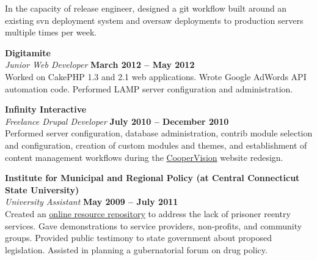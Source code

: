 \documentclass[margin,line]{resume}
\begin{document}
\begin{resume}
    In the capacity of release engineer, designed a git workflow built around an existing svn deployment system and oversaw deployments to production servers multiple times per week.

    \textbf{Digitamite} \vspace{2mm}\\\vspace{1mm}%
    \textsl{Junior Web Developer} \hfill \textbf{March 2012 -- May 2012}\\
    Worked on CakePHP 1.3 and 2.1 web applications. Wrote Google AdWords API automation code. Performed LAMP server configuration and administration.

    \textbf{Infinity Interactive} \vspace{2mm}\\\vspace{1mm}%
    \textsl{Freelance Drupal Developer} \hfill \textbf{July 2010 -- December 2010}\\
    Performed server configuration, database administration, contrib module selection and configuration, creation of custom modules and themes, and establishment of content management workflows during the \href{http://www.coopervision.com}{CooperVision} website redesign.

    \textbf{Institute for Municipal and Regional Policy (at Central Connecticut State University)} \vspace{2mm}\\\vspace{1mm}%
    \textsl{University Assistant} \hfill \textbf{May 2009 -- July 2011}\\
    Created an \href{http://www.ctreentry.info}{online resource repository} to address the lack of prisoner reentry services. Gave demonstrations to service providers, non-profits, and community groups. Provided public testimony to state government about proposed legislation. Assisted in planning a gubernatorial forum on drug policy.




\end{resume}
\end{document}
